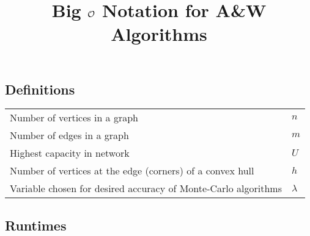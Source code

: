 \documentclass[a4paper,10pt]{article}
\title{\vspace*{-4cm}Big \(\mathcal{O}\) Notation for A\&W Algorithms}
\date{}
\begin{document}
    \maketitle
    \vspace*{-1.5cm}
    \renewcommand{\arraystretch}{1.25}
    \subsection*{Definitions}
    \begin{center}
        \begin{tabularx}{\textwidth}{l >{\raggedleft\arraybackslash}X}
            \toprule
            Number of vertices in a graph & \(n\) \\
            Number of edges in a graph & \(m\) \\
            Highest capacity in network & \(U\) \\
            Number of vertices at the edge (corners) of a convex hull & \(h\) \\
            Variable chosen for desired accuracy of Monte-Carlo algorithms & \(\lambda\) \\
            \bottomrule
        \end{tabularx}
    \end{center}

    \subsection*{Runtimes}
\end{document}
